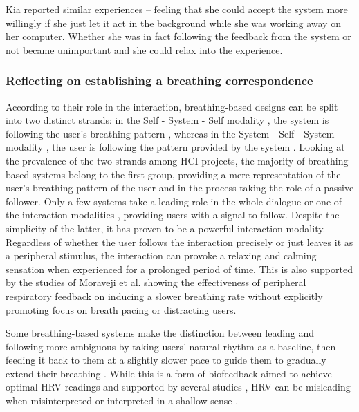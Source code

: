 Kia reported similar experiences -- feeling that she could accept the system more willingly if she just let it act in the background while she was working away on her computer. Whether she was in fact following the feedback from the system or not became unimportant and she could relax into the experience. 

\subsubsection{Reflecting on establishing a breathing correspondence}

According to their role in the interaction, breathing-based designs can be split into two distinct strands: in the Self - System - Self modality \cite{prpa_inhaling_2020}, the system is following the user's breathing pattern \cite{abushakra_augmenting_2014, sonne_chillfish_2016, bingham_breath_2010, roo_inner_2017, prpa_hacking_2016, shaw_meditation_2007, aslan_hold_2016, pisa_towards_2017, sjoman_breathing_2018, moran_exopranayama:_2016}, whereas in the System - Self - System modality \cite{prpa_inhaling_2020}, the user is following the pattern provided by the system \cite{wongsuphasawat_you_2012, yu_breathe_2015, soyka_enhancing_2016, dijk_breathe_2011}. Looking at the prevalence of the two strands among HCI projects, the majority of breathing-based systems belong to the first group, providing a mere representation of the user's breathing pattern of the user and in the process taking the role of a passive follower. Only a few systems take a leading role in the whole dialogue \cite{wongsuphasawat_you_2012, yu_breathe_2015, soyka_enhancing_2016} or one of the interaction modalities \cite{bumatay_investigating_2017, patibanda_life_2017}, providing users with a signal to follow. Despite the simplicity of the latter, it has proven to be a powerful interaction modality. Regardless of whether the user follows the interaction precisely or just leaves it as a peripheral stimulus, the interaction can provoke a relaxing and calming sensation when experienced for a prolonged period of time. This is also supported by the studies of Moraveji et al. \cite{moraveji_peripheral_2011, moraveji_breathtray_2012} showing the effectiveness of peripheral respiratory feedback on inducing a slower breathing rate without explicitly promoting focus on breath pacing or distracting users. 

Some breathing-based systems make the distinction between leading and following more ambiguous by taking users' natural rhythm as a baseline, then feeding it back to them at a slightly slower pace to guide them to gradually extend their breathing \cite{moraveji_peripheral_2011, ghandeharioun_brightbeat_2017}. While this is a form of biofeedback aimed to achieve optimal HRV readings and supported by several studies \cite{vaschillo_characteristics_2006, steffen_impact_2017, sutarto_resonant_2012}, HRV can be misleading when misinterpreted or interpreted in a shallow sense \cite{hrv_cammann_2002}. 

